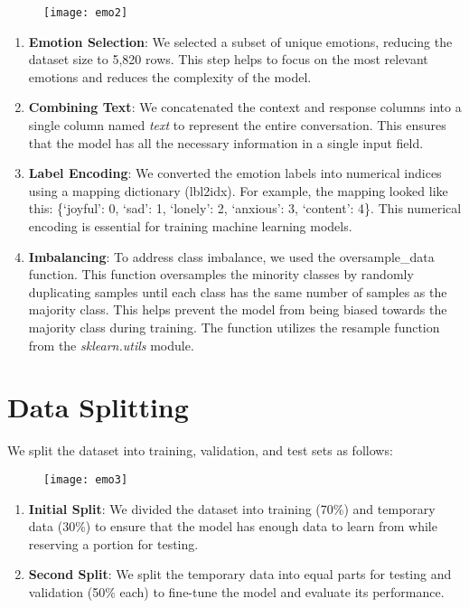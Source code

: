 \begin{figure}[h]
\texttt{[image: emo2]}
\centering
\end{figure}
\begin{enumerate}
    \item \textbf{Emotion Selection}: We selected a subset of unique emotions, reducing the dataset size to 5,820 rows. This step helps to focus on the most relevant emotions and reduces the complexity of the model.
    \item \textbf{Combining Text}: We concatenated the {context} and {response} columns into a single column named \textit{text} to represent the entire conversation. This ensures that the model has all the necessary information in a single input field.
    \item \textbf{Label Encoding}: We converted the emotion labels into numerical indices using a mapping dictionary ({lbl2idx}). For example, the mapping looked like this: \{‘joyful’: 0, ‘sad’: 1, ‘lonely’: 2, ‘anxious’: 3, ‘content’: 4\}. This numerical encoding is essential for training machine learning models.
    \item \textbf{Imbalancing}: To address class imbalance, we used the {oversample\_data} function. This function oversamples the minority classes by randomly duplicating samples until each class has the same number of samples as the majority class. This helps prevent the model from being biased towards the majority class during training. The function utilizes the {resample} function from the \textit{sklearn.utils} module.
\end{enumerate}

\section{Data Splitting}
We split the dataset into training, validation, and test sets as follows:

\begin{figure}[h]
\texttt{[image: emo3]}
\centering
\end{figure}
\begin{enumerate}
    \item \textbf{Initial Split}: We divided the dataset into training (70\%) and temporary data (30\%) to ensure that the model has enough data to learn from while reserving a portion for testing.
    \item \textbf{Second Split}: We split the temporary data into equal parts for testing and validation (50\% each) to fine-tune the model and evaluate its performance.
\end{enumerate}

